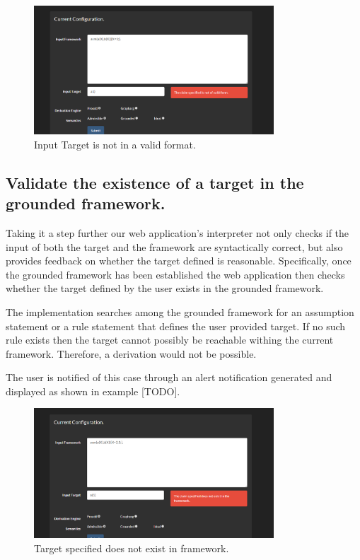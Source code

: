 \begin{figure}[h]
    \centering
    \includegraphics[width=0.8\textwidth]{inputClaimInvalid.png}
    \caption{Input Target is not in a valid format.}
    \label{fig:invalid_claim}
\end{figure}

\subsection{Validate the existence of a target in the grounded framework.}
Taking it a step further our web application's interpreter not only checks if the input of both the target and the framework are syntactically correct, but also provides feedback on whether the target defined is reasonable. Specifically, once the grounded framework has been established the web application then checks whether the target defined by the user exists in the grounded framework.

The implementation searches among the grounded framework for an assumption statement or a rule statement that defines the user provided target. If no such rule exists then the target cannot possibly be reachable withing the current framework. Therefore, a derivation would not be possible.

The user is notified of this case through an alert notification generated and displayed as shown in example [TODO].

\clearpage

\begin{figure}[h]
    \centering
    \includegraphics[width=0.8\textwidth]{inputNotFramework.png}
    \caption{Target specified does not exist in framework.}
    \label{fig:not_in_frm}
\end{figure}

